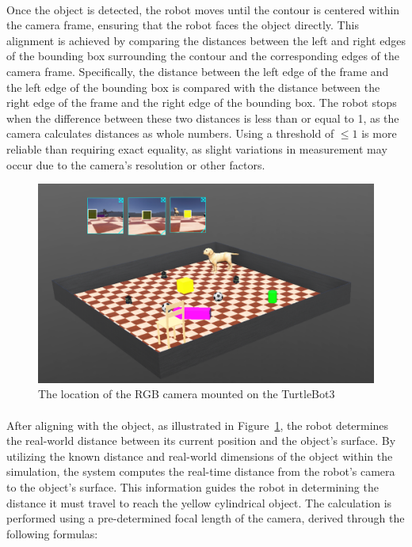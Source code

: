 \paragraph*{}
Once the object is detected, the robot moves until the contour is centered within the camera frame, ensuring that the robot faces the object directly. This alignment is achieved by comparing the distances between the left and right edges of the bounding box surrounding the contour and the corresponding edges of the camera frame. Specifically, the distance between the left edge of the frame and the left edge of the bounding box is compared with the distance between the right edge of the frame and the right edge of the bounding box. The robot stops when the difference between these two distances is less than or equal to 1, as the camera calculates distances as whole numbers. Using a threshold of \(\leq 1\) is more reliable than requiring exact equality, as slight variations in measurement may occur due to the camera's resolution or other factors.

\begin{figure}[H]
    \centering
    \includegraphics[width=0.7\linewidth]{assets/images/object_detection/fig2.png}
    \caption{The location of the RGB camera mounted on the TurtleBot3}
    \label{fig:object detection figure 2} 
\end{figure}

\paragraph*{}
After aligning with the object, as illustrated in Figure~\ref{fig:object detection figure 2}, the robot determines the real-world distance between its current position and the object's surface. By utilizing the known distance and real-world dimensions of the object within the simulation, the system computes the real-time distance from the robot's camera to the object's surface. This information guides the robot in determining the distance it must travel to reach the yellow cylindrical object. The calculation is performed using a pre-determined focal length of the camera, derived through the following formulas:

